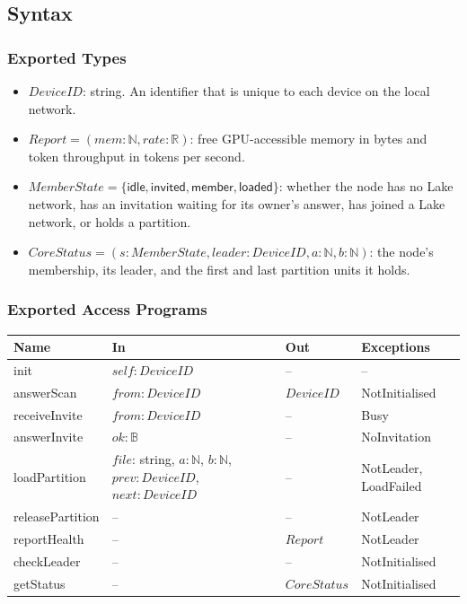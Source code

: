 \documentclass[12pt, titlepage]{article}
\begin{document}
\subsection{Syntax}

\subsubsection{Exported Types}

\begin{itemize}
  \item $\mathit{DeviceID}$: string. An identifier that is unique to each device
    on the local network.
  \item $\mathit{Report} = (\mathit{mem}: \mathbb{N}, \mathit{rate}:
    \mathbb{R})$: free GPU-accessible memory in bytes and token throughput in
    tokens per second.
  \item $\mathit{MemberState} = \{\mathsf{idle}, \mathsf{invited},
    \mathsf{member}, \mathsf{loaded}\}$: whether the node has no Lake network,
    has an invitation waiting for its owner's answer, has joined a Lake network,
    or holds a partition.
  \item $\mathit{CoreStatus} = (s: \mathit{MemberState}, \mathit{leader}:
    \mathit{DeviceID}, a: \mathbb{N}, b: \mathbb{N})$: the node's membership,
    its leader, and the first and last partition units it holds.
\end{itemize}

\subsubsection{Exported Access Programs}

\begin{center}
\begin{tabular}{p{3.3cm} p{4.3cm} p{2.0cm} p{3.8cm}}
\toprule
\textbf{Name} & \textbf{In} & \textbf{Out} & \textbf{Exceptions} \\
\midrule
init & $\mathit{self}: \mathit{DeviceID}$ & -- & -- \\
answerScan & $\mathit{from}: \mathit{DeviceID}$ & $\mathit{DeviceID}$ & NotInitialised \\
receiveInvite & $\mathit{from}: \mathit{DeviceID}$ & -- & Busy \\
answerInvite & $\mathit{ok}: \mathbb{B}$ & -- & NoInvitation \\
loadPartition & $\mathit{file}$: string, $a: \mathbb{N}$, $b: \mathbb{N}$,
  $\mathit{prev}: \mathit{DeviceID}$, $\mathit{next}: \mathit{DeviceID}$
  & -- & NotLeader, LoadFailed \\
releasePartition & -- & -- & NotLeader \\
reportHealth & -- & $\mathit{Report}$ & NotLeader \\
checkLeader & -- & -- & NotInitialised \\
getStatus & -- & $\mathit{CoreStatus}$ & NotInitialised \\
\bottomrule
\end{tabular}
\end{center}
\end{document}
